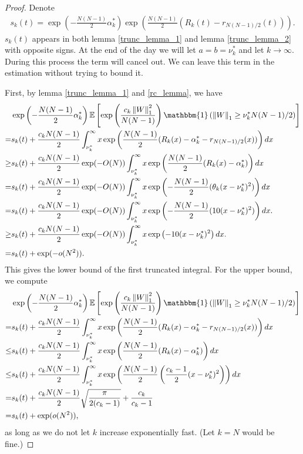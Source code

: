 \documentclass[10pt]{article}
\newcommand{\e}{\mathbb{E}}
\newcommand{\norm}[1]{\left\lVert#1\right\rVert}
\newenvironment{Proof of lemma}{\noindent{\bf Proof of Lemma}}{\hfill$\Box$\newline}
\newenvironment{Proof of claim}{\noindent{\bf Proof of claim}}{\hfill$\Box$\newline}
\newenvironment{Proof of theorem}{\noindent{\bf Proof of Theorem}}{\hfill\scriptsize{$\Box$}\newline}
\newenvironment{Proof of theorems}{\noindent{\bf Proof of Theorems}}{\hfill$\Box$\newline}
\newenvironment{Proof of proposition}{\noindent{\bf Proof of Proposition}}{\hfill$\Box$\newline}
\newenvironment{Proof of propositions}{\noindent{\bf Proof of Propositions}}{\hfill$\Box$\newline}
\newenvironment{Proof of exercise}{\noindent{\it Proof of Exercise:}}{\hfill$\Box$}
\numberwithin{equation}{section}
\begin{document}
\begin{proof}
Denote
\begin{align}
    s_k(t)=\exp\left(-\frac{N(N-1)}{2}\alpha_k^* \right)\exp\left(\frac{N(N-1)}{2}(R_k(t)-r_{N(N-1)/2}(t))\right).
\end{align}
$s_k(t)$ appears in both lemma \ref{trunc_lemma_1} and lemma \ref{trunc_lemma_2} with opposite signs. At the end of the day we will let $a=b=\nu^*_k$ and let $k \to \infty$. During this process the term will cancel out. We can leave this term in the estimation without trying to bound it.

First, by lemma \ref{trunc_lemma_1} and \ref{rc_lemma}, we have
\begin{align}
    &\exp\left(-\frac{N(N-1)}{2} \alpha_k^* \right)\e\left[ \exp \left(\frac{c_k\norm{W}^2_1}{N(N-1)}\right) \mathbbm{1}\left(\norm{W}_1 \geq \nu^*_k N(N-1)/2\right)\right] \nonumber \\
    =&s_k(t) + \frac{c_kN(N-1)}{2}\int_{\nu^*_k}^{\infty}x \exp \left(\frac{N(N-1)}{2}(R_k(x)-\alpha_k^* -r_{N(N-1)/2}(x))\right)dx \nonumber \\
    \geq& s_k(t) + \frac{c_kN(N-1)}{2} \exp(-O(N))\int_{\nu^*_k}^{\infty}x \exp \left(\frac{N(N-1)}{2}(R_k(x)-\alpha_k^*)\right)dx \nonumber \\ 
    =& s_k(t) + \frac{c_kN(N-1)}{2}\exp(-O(N))\int_{\nu^*_k}^{\infty}x \exp \left(-\frac{N(N-1)}{2}(\theta_k(x-\nu^*_k)^2)\right)dx \nonumber \\
    =& s_k(t) + \frac{c_kN(N-1)}{2}\exp(-O(N))\int_{\nu^*_k}^{\infty}x \exp \left(-\frac{N(N-1)}{2}(10(x-\nu^*_k)^2)\right)dx. \nonumber \\
    \geq& s_k(t) + \frac{c_kN(N-1)}{2}\exp(-O(N))\int_{\nu^*_k}^{\infty}x \exp \left(-10(x-\nu^*_k)^2 \right)dx. \nonumber \\
    =&s_k(t) + \exp(-o(N^2)).
\end{align}
This gives the lower bound of the first truncated integral. For the upper bound, we compute
\begin{align}
    &\exp\left(-\frac{N(N-1)}{2} \alpha_k^* \right)\e\left[ \exp \left(\frac{c_k\norm{W}^2_1}{N(N-1)}\right) \mathbbm{1}\left(\norm{W}_1 \geq \nu^*_k N(N-1)/2\right)\right] \nonumber \\
    =&s_k(t) + \frac{c_kN(N-1)}{2}\int_{\nu^*_k}^{\infty}x \exp \left(\frac{N(N-1)}{2}(R_k(x)-\alpha_k^* -r_{N(N-1)/2}(x))\right)dx \nonumber \\
    \leq& s_k(t) + \frac{c_kN(N-1)}{2}\int_{\nu^*_k}^{\infty}x \exp \left(\frac{N(N-1)}{2}(R_k(x)-\alpha_k^*)\right)dx \nonumber \\
    \leq& s_k(t) + \frac{c_kN(N-1)}{2}\int_{\nu^*_k}^{\infty}x \exp \left(\frac{N(N-1)}{2}\left(\frac{c_k-1}{2}(x-\nu^*_k)^2\right)\right)dx \nonumber \\
    =&s_k(t) + \frac{c_kN(N-1)}{2} \sqrt{\frac{\pi}{2(c_k-1)}} + \frac{c_k}{c_k-1} \nonumber \\
    =&s_k(t) + \exp(o(N^2)),
\end{align}
as long as we do not let $k$ increase exponentially fast. (Let $k=N$ would be fine.)


\end{proof}
\end{document}
